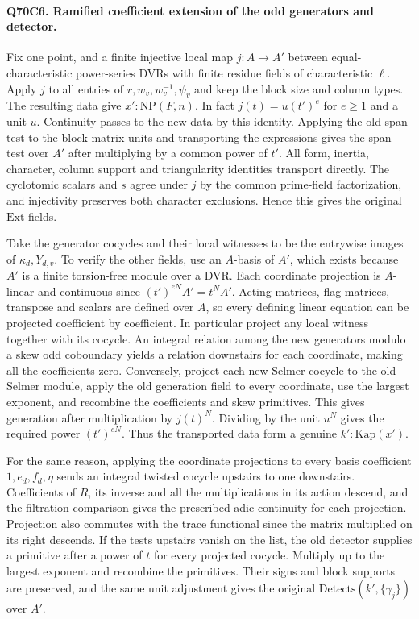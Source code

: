 \paragraph{Q70C6. Ramified coefficient extension of the odd generators and detector.}
Fix one point, and a finite injective local map $j:A\to A'$
between equal-characteristic power-series DVRs with finite
residue fields of characteristic $\ell$. Apply $j$ to all entries
of $r,w_v,w_v^{-1},\psi_v$ and keep the block size and column
types. The resulting data give $x':\mathrm{NP}(F,n)$.
In fact $j(t)=u(t')^e$ for $e\ge1$ and a unit $u$. Continuity
passes to the new data by this identity. Applying the old span
test to the block matrix units and transporting the expressions
gives the span test over $A'$ after multiplying by a common
power of $t'$. All form, inertia, character, column support
and triangularity identities transport directly. The cyclotomic
scalars and $s$ agree under $j$ by the common prime-field
factorization, and injectivity preserves both character exclusions.
Hence this gives the original $\mathrm{Ext}$ fields.

Take the generator cocycles and their local witnesses to be
the entrywise images of $\kappa_d,Y_{d,v}$. To verify the other
fields, use an $A$-basis of $A'$, which exists because $A'$ is a
finite torsion-free module over a DVR. Each coordinate projection
is $A$-linear and continuous since $(t')^{eN}A'=t^NA'$.
Acting matrices, flag matrices, transpose and scalars are
defined over $A$, so every defining linear equation can be
projected coefficient by coefficient. In particular project any
local witness together with its cocycle. An integral relation
among the new generators modulo a skew odd coboundary yields
a relation downstairs for each coordinate, making all the
coefficients zero. Conversely, project each new Selmer cocycle
to the old Selmer module, apply the old generation field to
every coordinate, use the largest exponent, and recombine the
coefficients and skew primitives. This gives generation after
multiplication by $j(t)^N$. Dividing by the unit $u^N$ gives
the required power $(t')^{eN}$. Thus the transported data form
a genuine $k':\mathrm{Kap}(x')$.

For the same reason, applying the coordinate projections to every
basis coefficient $1,e_d,f_d,\eta$ sends an integral twisted
cocycle upstairs to one downstairs. Coefficients of $R$, its
inverse and all the multiplications in its action descend, and the
filtration comparison gives the prescribed adic continuity for
each projection. Projection also commutes with the trace functional
since the matrix multiplied on its right descends. If the tests
upstairs vanish on the list, the old detector supplies a primitive
after a power of $t$ for every projected cocycle. Multiply up to
the largest exponent and recombine the primitives. Their signs and
block supports are preserved, and the same unit adjustment gives
the original $\mathrm{Detects}(k',\{\gamma_j\})$ over $A'$.

